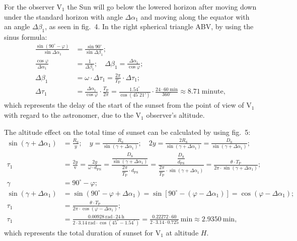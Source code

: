 \begin{description}
  For the observer $\mathrm{V}_1$ the Sun will go below the lowered horizon
  after moving down under the standard horizon with angle $\Delta\alpha_1$
  and moving along the equator with an angle $\Delta\beta_1$, as seen in
  fig.~4.
  In the right spherical triangle ABV, by using the sinus formula:
  \begin{align*}
  \frac{\sin(90^\circ - \varphi)}{\sin\Delta\alpha_1}
    &= \frac{\sin 90^\circ}{\sin\Delta\beta_1};\\
  \frac{\cos\varphi}{\Delta\alpha_1} &= \frac{1}{\Delta\beta_1};\quad
    \Delta\beta_1 = \frac{\Delta\alpha_1}{\cos\varphi};\\
  \Delta\beta_1 &= \omega\cdot\Delta\tau_1
    = \frac{2\pi}{T_{\mathrm{P}}}\cdot\Delta\tau_1;\\
  \Delta\tau_1 &= \frac{\Delta\alpha_1}{\cos\varphi}\cdot
      \frac{T_{\mathrm{P}}}{2\pi}
    = \frac{1.54^\circ}{\cos(45^\circ 21')}\cdot
      \frac{24\cdot 60\ \mathrm{min}}{360^\circ}
    \approx 8.71\ \mathrm{minute},
  \end{align*}
  which represents the delay of the start of the sunset from the point of
  view of $\mathrm{V}_1$ with regard to the astronomer, due to the
  $\mathrm{V}_1$ observer's altitude.

  The altitude effect on the total time of sunset can be calculated by using
  fig.~5:
  \begin{align*}
  \sin(\gamma + \Delta\alpha_1) &= \frac{R_{\mathrm{S}}}{y};\quad
    y = \frac{R_{\mathrm{S}}}{\sin(\gamma + \Delta\alpha_1)};\quad
    2y = \frac{2R_{\mathrm{S}}}{\sin(\gamma + \Delta\alpha_1)}
       = \frac{D_{\mathrm{S}}}{\sin(\gamma + \Delta\alpha_1)};\\
  \tau_1 &= \frac{2y}{\mathrm{v}}
    = \frac{2y}{\omega\cdot d_{\mathrm{PS}}}
    = \frac{\dfrac{D_{\mathrm{S}}}{\sin(\gamma + \Delta\alpha_1)}}
           {\dfrac{2\pi}{T_{\mathrm{P}}}\cdot d_{\mathrm{PS}}}
    = \frac{\dfrac{D_{\mathrm{S}}}{d_{\mathrm{PS}}}}
           {\dfrac{2\pi}{T_{\mathrm{P}}}\cdot\sin(\gamma + \Delta\alpha_1)}
    = \frac{\theta\cdot T_{\mathrm{P}}}
           {2\pi\cdot\sin(\gamma + \Delta\alpha_1)};\\
  \gamma &= 90^\circ - \varphi;\\
  \sin(\gamma + \Delta\alpha_1)
    &= \sin(90^\circ - \varphi + \Delta\alpha_1)
     = \sin[90^\circ - (\varphi - \Delta\alpha_1)]
     = \cos(\varphi - \Delta\alpha_1);\\
  \tau_1 &= \frac{\theta\cdot T_{\mathrm{P}}}
                {2\pi\cdot\cos(\varphi - \Delta\alpha_1)};\\
  \tau_1 &= \frac{0.00928\ \mathrm{rad}\cdot 24\ \mathrm{h}}
               {2\cdot 3.14\ \mathrm{rad}\cdot\cos(45^\circ - 1.54^\circ)}
    = \frac{0.22272\cdot 60}{2\cdot 3.14\cdot 0.725}\ \mathrm{min}
    \approx 2.9350\ \mathrm{min},
  \end{align*}
  which represents the total duration of sunset for $\mathrm{V}_1$ at
  altitude $H$.


\end{description}
